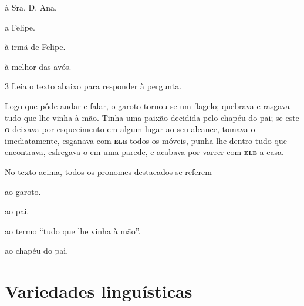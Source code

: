 \begin{escolha}
  
  \item à Sra. D. Ana.
  
  \item a Felipe.
  
  \item à irmã de Felipe. 
  
  \item à melhor das avós.

\end{escolha}

\num{3} Leia o texto abaixo para responder à pergunta.

\begin{myquote}

Logo que pôde andar e falar, o garoto tornou-se um flagelo; quebrava e rasgava tudo
que lhe vinha à mão. Tinha uma paixão decidida pelo chapéu do pai;
se este \textsc{\textbf{o}} deixava por esquecimento em algum lugar ao seu alcance, tomava-o
imediatamente, esganava com \textsc{\textbf{ele}} todos os móveis, punha-lhe dentro tudo que
encontrava, esfregava-o em uma parede, e acabava por varrer com \textsc{\textbf{ele}} a casa.


\end{myquote}


No texto acima, todos os pronomes destacados se referem 

\begin{escolha}

  \item ao garoto.

  \item ao pai. 

  \item ao termo ``tudo que lhe vinha à mão''. 

  \item ao chapéu do pai.

\end{escolha}


\chapter{Variedades linguísticas}

